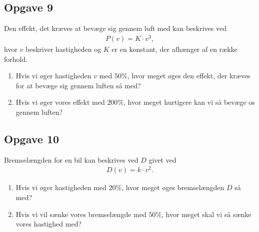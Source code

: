 \subsection*{Opgave 9}
Den effekt, det kræves at bevæge sig gennem luft med kan beskrives ved 
\begin{align*}
P(v) = K\cdot v^3,
\end{align*}
hvor $v$ beskriver hastigheden og $K$ er en konstant, der afhænger af en række forhold.
\begin{enumerate}[label=\roman*)]
\item Hvis vi øger hastigheden $v$ med $50\%$, hvor meget øges den effekt, der kræves for at bevæge sig gennem luften så med? 
\item Hvis vi øger vores effekt med $200\%$, hvor meget hurtigere kan vi så bevæge os gennem luften?
\end{enumerate}
\subsection*{Opgave 10}
Bremselængden for en bil kan beskrives ved $D$ givet ved
\begin{align*}
D(v) = k\cdot v^2.
\end{align*}
\begin{enumerate}[label=\roman*)]
\item Hvis vi øger hastigheden med $20\%$, hvor meget øges bremselængden $D$ så med?
\item Hvis vi vil sænke vores bremselængde med $50\%$, hvor meget skal vi så sænke vores hastighed med?
\end{enumerate}
